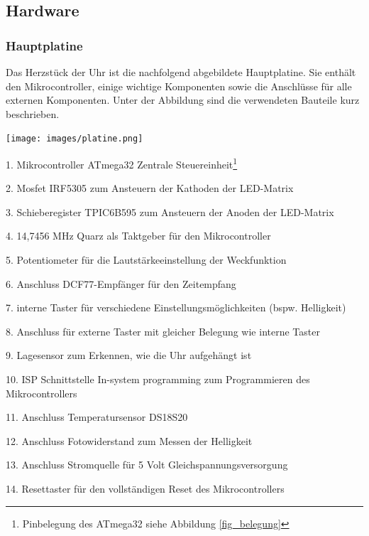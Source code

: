\subsection{Hardware}
\subsubsection{Hauptplatine}
Das Herzstück der Uhr ist die nachfolgend abgebildete Hauptplatine. Sie enthält den Mikrocontroller, einige wichtige Komponenten sowie die Anschlüsse für alle externen Komponenten. Unter der Abbildung sind die verwendeten Bauteile kurz beschrieben.

\begin{center}
\texttt{[image: images/platine.png]}
\label{img_platine}
\end{center}

\begin{list}{}
{\setlength{\topsep}{0cm}
\setlength{\itemsep}{0cm}
\setlength{\leftmargin}{3cm}
\setlength{\labelwidth}{3cm}
\setlength{\labelsep}{0cm}
\renewcommand{\makelabel}[1]{\textbf{\textsf{\normalsize #1} }}}
\item[1. Mikrocontroller ATmega32] Zentrale Steuereinheit\footnote{Pinbelegung des ATmega32 siehe Abbildung \ref{fig_belegung}}
\item[2. Mosfet IRF5305] zum Ansteuern der Kathoden der LED-Matrix
\item[3. Schieberegister TPIC6B595] zum Ansteuern der Anoden der LED-Matrix 
\item[4. 14,7456 MHz Quarz] als Taktgeber für den Mikrocontroller
\item[5. Potentiometer] für die Lautstärkeeinstellung der Weckfunktion
\item[6. Anschluss DCF77-Empfänger] für den Zeitempfang
\item[7. interne Taster] für verschiedene Einstellungsmöglichkeiten (bspw. Helligkeit)
\item[8. Anschluss für externe Taster] mit gleicher Belegung wie interne Taster
\item[9. Lagesensor] zum Erkennen, wie die Uhr aufgehängt ist
\item[10. ISP Schnittstelle] In-system programming zum Programmieren des Mikrocontrollers
\item[11. Anschluss Temperatursensor DS18S20] 
\item[12. Anschluss Fotowiderstand] zum Messen der Helligkeit
\item[13. Anschluss Stromquelle] für 5 Volt Gleichspannungsversorgung
\item[14. Resettaster] für den vollständigen Reset des Mikrocontrollers
\end{list}


